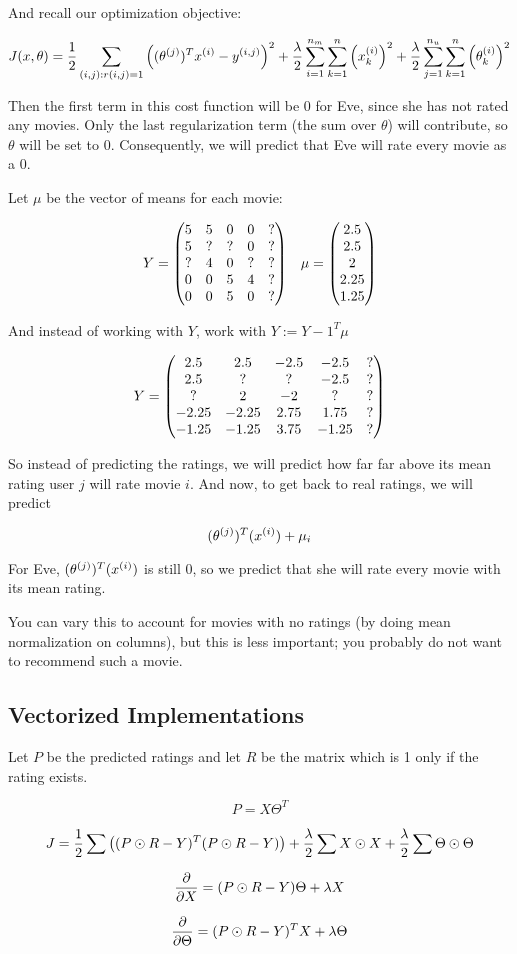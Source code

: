 And recall our optimization objective:

\[
    J( x, \theta ) = 
    \frac{1}{2} \sum_{(i,j) : r(i,j) = 1} \qty(
        (\theta_{}^{(j)})^T x_{}^{(i)} - y_{}^{(i,j)}
    )^2 +
    \frac{\lambda}{2} \sum_{i=1}^{n_m} \sum_{k=1}^n \qty( x_{k}^{(i)} )^2 + 
    \frac{\lambda}{2} \sum_{j=1}^{n_u} \sum_{k=1}^n \qty( \theta_{k}^{(i)} )^2
\]

Then the first term in this cost function will be 0 for Eve, since she has not rated any movies.
Only the last regularization term (the sum over $\theta$) will contribute, so $\theta$ will be set to 0.
Consequently, we will predict that Eve will rate every movie as a 0.

Let $\mu$ be the vector of means for each movie:

\[
    Y = \mqty(
        5 & 5 & 0 & 0 & ? \\
        5 & ? & ? & 0 & ? \\
        ? & 4 & 0 & ? & ? \\
        0 & 0 & 5 & 4 & ? \\
        0 & 0 & 5 & 0 & ?
    )
    \quad
    \mu = \mqty( 2.5 \\ 2.5 \\ 2 \\ 2.25 \\ 1.25 )
\]

And instead of working with $Y$, work with $Y := Y - 1^T \mu$

\[
    Y = \mqty(
        2.5 & 2.5 & -2.5 & -2.5 & ? \\
        2.5 & ? & ? & -2.5 & ? \\
        ? & 2 & -2 & ? & ? \\
        -2.25 & -2.25 & 2.75 & 1.75 & ? \\
        -1.25 & -1.25 & 3.75 & -1.25 & ?
    )
\]

So instead of predicting the ratings, we will predict how far far above its mean rating user $j$ will rate movie $i$.
And now, to get back to real ratings, we will predict

\[ (\theta_{}^{(j)})^T (x_{}^{(i)}) + \mu_i \]

For Eve, $(\theta_{}^{(j)})^T (x_{}^{(i)})$ is still 0, so we predict that she will rate every movie with its mean rating.

You can vary this to account for movies with no ratings (by doing mean normalization on columns),
but this is less important; you probably do not want to recommend such a movie.

\subsection{Vectorized Implementations}

Let $P$ be the predicted ratings and let $R$ be the matrix which is 1 only if the rating exists.

\[ P = X \Theta^T \]

\[
    J = \frac{1}{2} \sum \qty((P \odot R - Y)^T (P \odot R - Y))
        + \frac{\lambda}{2} \sum X \odot X
        + \frac{\lambda}{2} \sum \Theta \odot \Theta
\]

\[
    \pdv{X} = (P \odot R - Y) \Theta + \lambda X
\]

\[
    \pdv{\Theta} = (P \odot R - Y)^T X + \lambda \Theta
\]